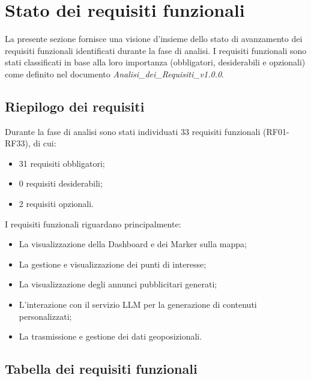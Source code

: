 \documentclass[10pt]{article}
\begin{document}
\newpage

\section{Stato dei requisiti funzionali}

La presente sezione fornisce una visione d'insieme dello stato di avanzamento dei requisiti funzionali identificati durante la fase di analisi. I requisiti funzionali sono stati classificati in base alla loro importanza (obbligatori, desiderabili e opzionali) come definito nel documento \textit{Analisi\_dei\_Requisiti\_v1.0.0}.

\subsection{Riepilogo dei requisiti}
Durante la fase di analisi sono stati individuati 33 requisiti funzionali (RF01-RF33), di cui:
\begin{itemize}
    \item 31 requisiti obbligatori;
    \item 0 requisiti desiderabili;
    \item 2 requisiti opzionali.
\end{itemize}

I requisiti funzionali riguardano principalmente:
\begin{itemize}
    \item La visualizzazione della Dashboard e dei Marker sulla mappa;
    \item La gestione e visualizzazione dei punti di interesse;
    \item La visualizzazione degli annunci pubblicitari generati;
    \item L'interazione con il servizio LLM per la generazione di contenuti personalizzati;
    \item La trasmissione e gestione dei dati geoposizionali.
\end{itemize}

\subsection{Tabella dei requisiti funzionali}
\end{document}
